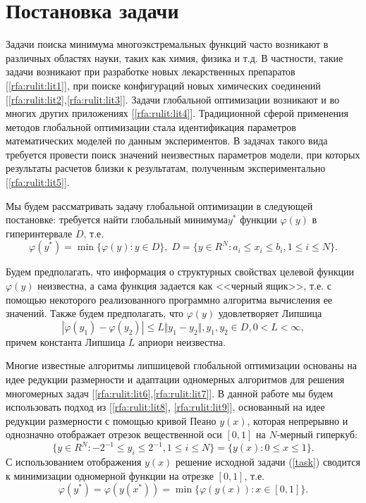 \documentclass[10pt,a4paper]{book}
\begin{document}
\MakeArticleHeader

\pagebreak



\section{Постановка задачи}

Задачи поиска минимума многоэкстремальных функций часто возникают в различных областях науки, таких как химия, физика и т.д. В частности, такие задачи возникают при разработке новых лекарственных препаратов [\ref{rfa:rulit:lit1}], при поиске конфигураций новых химических соединений [\ref{rfa:rulit:lit2},\ref{rfa:rulit:lit3}]. Задачи глобальной оптимизации возникают и во многих других приложениях [\ref{rfa:rulit:lit4}]. Традиционной сферой применения методов глобальной оптимизации стала идентификация параметров математических моделей по данным экспериментов. В задачах такого вида требуется провести поиск значений неизвестных параметров модели, при которых результаты расчетов близки к результатам, полученным экспериментально [\ref{rfa:rulit:lit5}].

Мы будем рассматривать задачу глобальной оптимизации в следующей постановке: требуется найти глобальный минимума$y^*$ функции $\varphi(y)$ в гиперинтервале $D$, т.е. 
\begin{equation}
\label{task}
\varphi(y^*)=\min\{\varphi(y):y\in D\}, \; D=\{y\in R^N:a_i\leqslant x_i\leqslant{b_i}, 1\leqslant{i}\leqslant{N}\}.
\end{equation}

Будем предполагать, что информация о структурных свойствах целевой функции $\varphi(y)$ неизвестна, а сама функция задается как <<черный ящик>>, т.е. с помощью некоторого реализованного программно алгоритма вычисления ее значений. Также будем предполагать, что $\varphi(y)$ удовлетворяет Липшица 
\begin{equation}
\label{lip}
|\varphi(y_1)-\varphi(y_2)|\leqslant L\Vert y_1-y_2\Vert,y_1,y_2\in D,0<L<\infty,
\end{equation}
причем константа Липшица $L$ априори неизвестна.

Многие известные алгоритмы липшицевой глобальной оптимизации основаны на идее редукции размерности и адаптации одномерных алгоритмов для решения многомерных задач [\ref{rfa:rulit:lit6},\ref{rfa:rulit:lit7}]. 
В данной работе мы будем использовать подход из [\ref{rfa:rulit:lit8}, \ref{rfa:rulit:lit9}], основанный на идее редукции размерности с помощью кривой Пеано  
$y(x)$, которая непрерывно и однозначно отображает отрезок вещественной оси $[0,1]$ на $N$-мерный гиперкуб:
\begin{equation}
\label{cube}
\lbrace y\in R^N:-2^{-1}\leqslant y_i\leqslant 2^{-1}, 1\leqslant i\leqslant N\rbrace=\{y(x): 0\leqslant x\leqslant 1\}.
\end{equation}
С использованием отображения $y(x)$ решение исходной задачи (\ref{task}) сводится к минимизации одномерной функции на отрезке $[0,1]$, т.е.
\begin{equation}
\label{oneDimTask}
\varphi(y^*)=\varphi(y(x^*))=\min\{\varphi(y(x)): x\in [0,1]\}.
\end{equation}
 
\end{document}
